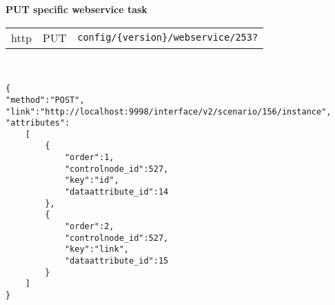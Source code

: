 		
		\textbf{PUT specific webservice task}\\
			\begin{tabular}{lll}
				http & PUT & \texttt{config/\{version\}/webservice/253?}
			\end{tabular}\\
		\begin{flushleft}
			\begin{lstlisting}
{
"method":"POST",
"link":"http://localhost:9998/interface/v2/scenario/156/instance",
"attributes":
    [
        {
            "order":1,
            "controlnode_id":527,
            "key":"id",
            "dataattribute_id":14
        },
        {
            "order":2,
            "controlnode_id":527,
            "key":"link",
            "dataattribute_id":15
        }
    ]
}
			\end{lstlisting}
		\end{flushleft}